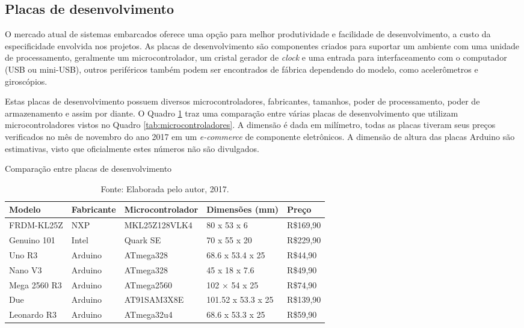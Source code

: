 \subsection{Placas de desenvolvimento} 
\label{sec:placasdedesenvolvimento}

O mercado atual de sistemas embarcados oferece uma opção para melhor produtividade e facilidade de desenvolvimento, a custo da especificidade envolvida nos projetos. As placas de desenvolvimento são componentes criados para suportar um ambiente com uma unidade de processamento, geralmente um microcontrolador, um cristal gerador de \textit{clock} e uma entrada para interfaceamento com o computador (USB ou mini-USB), outros periféricos também podem ser encontrados de fábrica dependendo do modelo, como acelerômetros e giroscópios. 

Estas placas de desenvolvimento possuem diversos microcontroladores, fabricantes, tamanhos, poder de processamento, poder de armazenamento e assim por diante. O Quadro \ref{tab:placasdedesenvolvimento} traz uma comparação entre várias placas de desenvolvimento que utilizam microcontroladores vistos no Quadro \ref{tab:microcontroladores}. A dimensão é dada em milímetro, todas as placas tiveram seus preços verificados no mês de novembro do ano 2017 em um \textit{e-commerce} de componente eletrônicos\cite{filipeflop}. A dimensão de altura das placas Arduino são estimativas, visto que oficialmente estes números não são divulgados. 

\begin{table}[!htb]
	\centering
	\caption{Comparação entre placas de desenvolvimento}
	\label{tab:placasdedesenvolvimento}
	\begin{tabular}{|l|l|l|l|l|}
	\hline
	\rowcolor[HTML]{9B9B9B} 
	\textbf{Modelo}      & \textbf{Fabricante} & \textbf{Microcontrolador} & \textbf{Dimensões (mm)} & \textbf{Preço} \\ \hline
	FRDM-KL25Z		   & NXP                 & MKL25Z128VLK4             & 80 x 53 x 6        & R\$169,90      \\ \hline
	Genuino 101        & Intel               & Quark SE                  & 70 x 55 x 20       & R\$229,90      \\ \hline
	Uno R3             & Arduino             & ATmega328                 & 68.6 x 53.4 x 25   & R\$44,90       \\ \hline
	Nano V3            & Arduino             & ATmega328                 & 45 x 18 x 7.6      & R\$49,90       \\ \hline
	Mega 2560 R3       & Arduino             & ATmega2560                & 102 × 54 x 25      & R\$74,90       \\ \hline
	Due                & Arduino             & AT91SAM3X8E               & 101.52 x 53.3 x 25 & R\$139,90      \\ \hline
	Leonardo R3        & Arduino             & ATmega32u4                & 68.6 x 53.3 x 25   & R\$59,90       \\ \hline
	\end{tabular}
	\caption*{Fonte: Elaborada pelo autor, 2017.}
\end{table}

